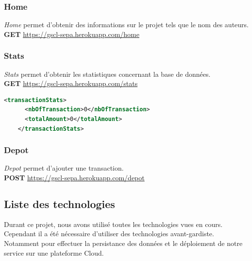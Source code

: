 \documentclass{article}
\begin{document}
      \subsubsection{Home}
	\emph{Home} permet d'obtenir des informations sur le projet tels que le nom des auteurs.\\
	\textbf{GET} \url{https://gscl-sepa.herokuapp.com/home}
	
      \subsubsection{Stats}
	\emph{Stats} permet d'obtenir les statistiques concernant la base de données.\\
	\textbf{GET} \url{https://gscl-sepa.herokuapp.com/stats}
	\begin{lstlisting}[language=xml]
    <transactionStats>
      <nbOfTransaction>0</nbOfTransaction>
      <totalAmount>0</totalAmount>
    </transactionStats>
	  \end{lstlisting}
      \subsubsection{Depot}
	\emph{Depot} permet d'ajouter une transaction.\\
	\textbf{POST} \url{https://gscl-sepa.herokuapp.com/depot}
      
    
    \subsection{Liste des technologies}
      Durant ce projet, nous avons utilisé toutes les technologies vues en cours. Cependant il a été nécessaire 
      d'utiliser des technologies avant-gardiste.
      Notamment pour effectuer la persistance des données et le déploiement de notre service sur une plateforme Cloud.
\end{document}
